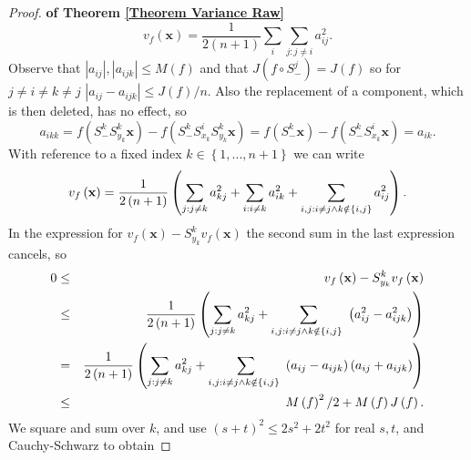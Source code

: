 \documentclass[final,12pt]{colt2018} %
\begin{document}
\begin{proof}{\bf of Theorem \protect\ref{Theorem Variance Raw}}
							\begin{equation}
							v_{f}\left( \mathbf{x}\right) =\frac{1}{2\left( n+1\right) }%
							\sum_{i}\sum_{j:j\neq i}a_{ij}^{2}.  \label{reference inequality}
							\end{equation}%
							Observe that $\left\vert a_{ij}\right\vert ,\left\vert a_{ijk}\right\vert
							\leq M\left( f\right) $ and that $J( f\circ S_{-}^{j}) =J(
							f) $ so for $j\neq i\neq k\neq j$ $\left\vert
							a_{ij}-a_{ijk}\right\vert \leq J\left( f\right) /n.$ Also the replacement of
							a component, which is then deleted, has no effect, so%
							\begin{equation*}
							a_{ikk}=f\left( S_{-}^{k}S_{y_{k}}^{k}\mathbf{x}\right) -f\left(
							S_{-}^{k}S_{x_{k}}^{i}S_{y_{k}}^{k}\mathbf{x}\right) =f\left( S_{-}^{k}%
							\mathbf{x}\right) -f\left( S_{-}^{k}S_{x_{k}}^{i}\mathbf{x}\right) =a_{ik}. 
							\end{equation*}%
							With reference to a fixed index $k\in \left\{ 1,...,n+1\right\} $ we can
							write 
							\begin{equation}
							v_{f}\left( \mathbf{x}\right) =\frac{1}{2\left( n+1\right) }\left(
							\sum_{j:j\neq k}a_{kj}^{2}+\sum_{i:i\neq k}a_{ik}^{2}+\sum_{i,j:i\neq
								j\wedge k\notin \left\{ i,j\right\} }a_{ij}^{2}\right) .  \notag
							\end{equation}%
							In the expression for $v_{f}\left( \mathbf{x}\right)
							-S_{y_{k}}^{k}v_{f}\left( \mathbf{x}\right) $ the second sum in the last
							expression cancels, so%
							\begin{eqnarray}
							0 &\leq &v_{f}\left( \mathbf{x}\right) -S_{y_{k}}^{k}v_{f}\left( \mathbf{x}%
							\right)  \notag \\
							&\leq &\frac{1}{2\left( n+1\right) }\left( \sum_{j:j\neq
								k}a_{kj}^{2}+\sum_{i,j:i\neq j\wedge k\notin \left\{ i,j\right\} \ }\left(
							a_{ij}^{2}-a_{ijk}^{2}\right) \right)  \notag \\
							&=&\frac{1}{2\left( n+1\right) }\left( \sum_{j:j\neq
								k}a_{kj}^{2}+\sum_{i,j:i\neq j\wedge k\notin \left\{ i,j\right\} \ }\left(
							a_{ij}-a_{ijk}\right) \left( a_{ij}+a_{ijk}\right) \right)  \notag \\
							&\leq &M\left( f\right) ^{2}/2+M\left( f\right) J\left( f\right) .
							\label{b-bound}
							\end{eqnarray}%
							We square and sum over $k$, and use $\left( s+t\right) ^{2}\leq
							2s^{2}+2t^{2} $ for real $s,t$, and Cauchy-Schwarz to obtain%

\end{proof}
\end{document}
